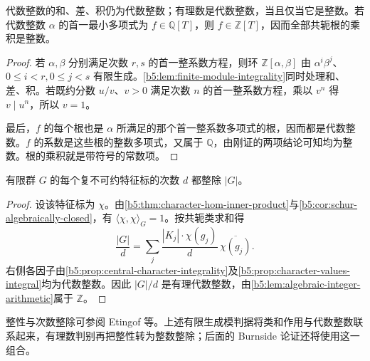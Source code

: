\begin{lemma}\label{b5:lem:algebraic-integer-arithmetic}
	代数整数的和、差、积仍为代数整数；有理数是代数整数，当且仅当它是整数。若代数整数 \(\alpha\) 的首一最小多项式为 \(f\in\mathbb Q[T]\)，则 \(f\in\mathbb Z[T]\)，因而全部共轭根的乘积是整数。
\end{lemma}
\begin{proof}
	若 \(\alpha,\beta\) 分别满足次数 \(r,s\) 的首一整系数方程，则环 \(\mathbb Z[\alpha,\beta]\) 由 \(\alpha^i\beta^j\)、\(0\le i<r,0\le j<s\) 有限生成。\cref{b5:lem:finite-module-integrality}同时处理和、差、积。若既约分数 \(u/v\)、\(v>0\) 满足次数 \(n\) 的首一整系数方程，乘以 \(v^n\) 得 \(v\mid u^n\)，所以 \(v=1\)。

	最后，\(f\) 的每个根也是 \(\alpha\) 所满足的那个首一整系数多项式的根，因而都是代数整数。\(f\) 的系数是这些根的整数多项式，又属于 \(\mathbb Q\)，由刚证的两项结论可知均为整数。根的乘积就是带符号的常数项。
\end{proof}

\begin{corollary}\label{b5:cor:character-degree-divisibility}
	有限群 \(G\) 的每个复不可约特征标的次数 \(d\) 都整除 \(|G|\)。
\end{corollary}
\begin{proof}
	设该特征标为 \(\chi\)。由\cref{b5:thm:character-hom-inner-product}与\cref{b5:cor:schur-algebraically-closed}，有 \(\langle\chi,\chi\rangle_G=1\)。按共轭类求和得
	\[
		\frac{|G|}{d} =\sum_j\frac{|K_j|\cdot\chi(g_j)}{d}\,\overline{\chi(g_j)}.
	\]
	右侧各因子由\cref{b5:prop:central-character-integrality}及\cref{b5:prop:character-values-integral}均为代数整数。因此 \(|G|/d\) 是有理代数整数，由\cref{b5:lem:algebraic-integer-arithmetic}属于 \(\mathbb Z\)。
\end{proof}

整性与次数整除可参阅 Etingof 等\cite[Sections 5.2--5.3, pp. 93--98]{EtingofEtAl2011RepresentationTheory}。上述有限生成模判据将类和作用与代数整数联系起来，有理数判别再把整性转为整数整除；后面的 Burnside 论证还将使用这一组合。
